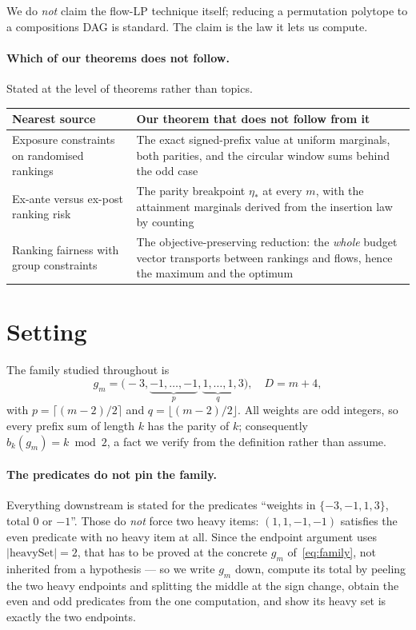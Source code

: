 We do \emph{not} claim the flow-LP technique itself; reducing a permutation polytope to a
compositions DAG is standard. The claim is the law it lets us compute.


\paragraph{Which of our theorems does not follow.}
Stated at the level of theorems rather than topics.

\begin{table}[h]
\centering
\footnotesize
\begin{tabular}{@{}p{}p{}@{}}
\toprule
Nearest source & Our theorem that does not follow from it \\
\midrule
Exposure constraints on randomised rankings & The exact signed-prefix value at uniform
marginals, both parities, and the circular window sums behind the odd case \\
Ex-ante versus ex-post ranking risk & The parity breakpoint $\eta_{*}$ at every $m$, with the
attainment marginals derived from the insertion law by counting \\
Ranking fairness with group constraints & The objective-preserving reduction: the
\emph{whole} budget vector transports between rankings and flows, hence the maximum and the
optimum \\
\bottomrule
\end{tabular}
\end{table}

\section{Setting}
\label{sec:setting}

The family studied throughout is
\begin{equation}
g_{m}=\bigl(-3,\underbrace{-1,\dots,-1}_{p},\underbrace{1,\dots,1}_{q},3\bigr),
\quad D=m+4,
\label{eq:family}
\end{equation}
with $p=\lceil(m-2)/2\rceil$ and $q=\lfloor(m-2)/2\rfloor$. All weights are odd integers, so
every prefix sum of length $k$ has the parity of $k$; consequently $b_{k}(g_{m})=k\bmod 2$,
a fact we verify from the definition rather than assume.

\paragraph{The predicates do not pin the family.}
Everything downstream is stated for the predicates ``weights in $\{-3,-1,1,3\}$, total $0$
or $-1$''. Those do \emph{not} force two heavy items: $(1,1,-1,-1)$ satisfies the even
predicate with no heavy item at all. Since the endpoint argument uses
$|\mathrm{heavySet}|=2$, that has to be proved at the concrete $g_{m}$ of~\eqref{eq:family},
not inherited from a hypothesis --- so we write $g_{m}$ down, compute its total by peeling
the two heavy endpoints and splitting the middle at the sign change, obtain the even and odd
predicates from the one computation, and show its heavy set is exactly the two endpoints.

